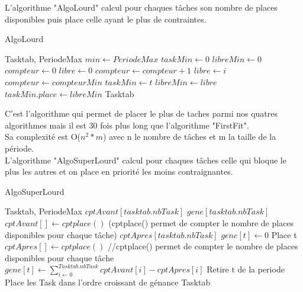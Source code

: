 \documentclass[11pt]{article}
\begin{document}
\newpage
L'algorithme "AlgoLourd" calcul pour chaques tâches son nombre de places disponibles puis place celle ayant le plus de contraintes.\\
\begin{algorithm}
    \caption{AlgoLourd}
    \begin{algorithmic}
    \REQUIRE Tasktab, PeriodeMax
    \STATE $min \leftarrow PeriodeMax$
    \STATE $taskMin \leftarrow 0$
    \STATE $libreMin \leftarrow 0$
        \STATE $compteur \leftarrow 0$
        \STATE $libre \leftarrow 0$
                    \STATE $compteur \leftarrow compteur + 1$
                    \STATE $libre \leftarrow i$
                \ENDIF
            \ENDFOR
                \STATE $compteur \leftarrow compteurMin$
                \STATE $taskMin \leftarrow t$
                \STATE $libreMin \leftarrow libre$
            \ENDIF
        \ENDFOR
        \STATE $taskMin.place \leftarrow libreMin$
    \ENDFOR
    \RETURN Tasktab
    \end{algorithmic}
\end{algorithm}

C'est l'algorithme qui permet de placer le plus de taches parmi nos quatres algorithmes mais il est 30 fois plus long que l'algorithme "FirstFit".\\
Sa complexité est O($n^2*m$) avec n le nombre de tâches et m la taille de la période.\\ 

\newpage
L'algorithme "AlgoSuperLourd" calcul pour chaques tâches celle qui bloque le plus les autres et on place en priorité les moins contraignantes.\\
\begin{algorithm}
    \caption{AlgoSuperLourd}
    \begin{algorithmic}
    \REQUIRE Tasktab, PeriodeMax
    \STATE $cptAvant[tasktab.nbTask]$
    \STATE $gene[tasktab.nbTask]$
        \STATE $cptAvant[] \leftarrow cptplace()$ (cptplace() permet de compter le nombre de places disponibles pour chaque tâche)
        \STATE $cptApres[tasktab.nbTask]$
            \STATE $gene[t] \leftarrow 0$
                    \STATE Place t
                \ENDIF
            \ENDFOR
            \STATE $cptApres[] \leftarrow cptplace()$ //cptplace() permet de compter le nombre de places disponibles pour chaque tâche
            \STATE $gene[t] \leftarrow \sum\limits_{i\leftarrow0}^{Tasktab.nbTask} cptAvant[i] - cptApres[i]$
            \STATE Retire t de la periode
        \ENDFOR
        \STATE Place les Task dans l'ordre croissant de génance
    \ENDFOR
    \RETURN Tasktab
    \end{algorithmic}
\end{algorithm}
\end{document}
